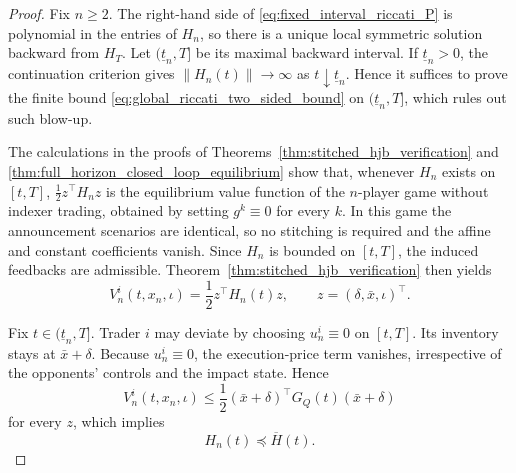 \documentclass[12pt]{article}
\numberwithin{equation}{section}
\theoremstyle{definition}
\begin{document}
\begin{proof}
Fix \(n\geq2\).  The right-hand side of
\eqref{eq:fixed_interval_riccati_P} is polynomial in the entries of \(H_n\),
so there is a unique local symmetric solution backward from \(H_T\).  Let
\((\underline t_n,T]\) be its maximal backward interval.  If
\(\underline t_n>0\), the continuation criterion gives
\(\|H_n(t)\|\to\infty\) as
\(t\downarrow\underline t_n\). Hence it suffices to prove the finite bound
\eqref{eq:global_riccati_two_sided_bound} on \((\underline t_n,T]\), which
rules out such blow-up.

The calculations in the proofs of
Theorems~\ref{thm:stitched_hjb_verification} and
\ref{thm:full_horizon_closed_loop_equilibrium} show that, whenever \(H_n\)
exists on \([t,T]\), \(\frac12z^\top H_nz\) is the equilibrium value
function of the \(n\)-player game without indexer trading, obtained by setting
\(g^k\equiv0\) for every \(k\). In this game the announcement scenarios are
identical, so no stitching is required and the affine and constant
coefficients vanish. Since \(H_n\) is bounded on \([t,T]\), the induced
feedbacks are admissible. Theorem~\ref{thm:stitched_hjb_verification} then
yields
\[
V_n^i(t,x_n,\iota)=\frac12z^\top H_n(t)z,
\qquad z=(\delta,\bar x,\iota)^\top.
\]

Fix \(t\in(\underline t_n,T]\). Trader \(i\) may
deviate by choosing \(u_n^i\equiv0\) on \([t,T]\). Its inventory stays at
\(\bar x+\delta\). Because \(u_n^i\equiv0\), the execution-price term
vanishes, irrespective of the opponents' controls and the impact state. Hence
\[
V_n^i(t,x_n,\iota)
\leq\frac12(\bar x+\delta)^\top G_Q(t)(\bar x+\delta)
\]
for every \(z\), which implies
\begin{equation}
\label{eq:uniform_solvability_upper_bound_proof}
H_n(t)\preceq\overline H(t).
\end{equation}


\end{proof}
\end{document}
